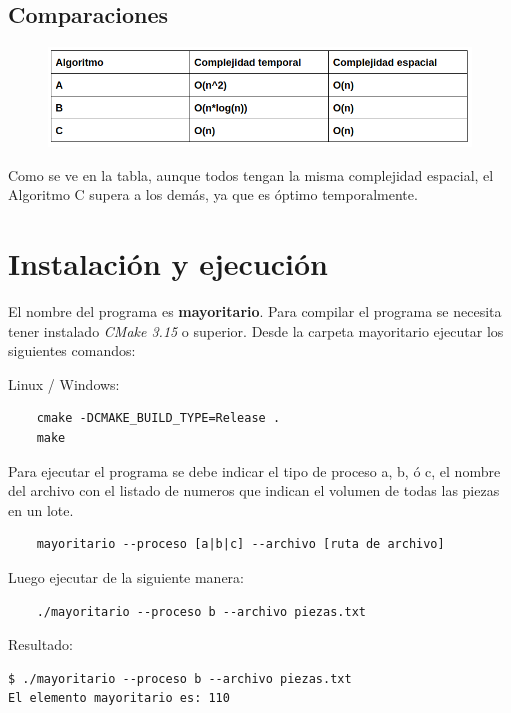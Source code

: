 \documentclass{article}
\begin{document}
\subsection{Comparaciones}

\begin{figure}[h!]
    \includegraphics[width=\linewidth]{comparacion.png}
\end{figure}


Como se ve en la tabla, aunque todos tengan la misma complejidad espacial, el Algoritmo C supera a los demás, ya que es óptimo temporalmente.

\newpage
\section{Instalación y ejecución}

El nombre del programa es \textbf{mayoritario}. Para compilar el programa se necesita tener 
instalado \textit{CMake 3.15} o superior. 
Desde la carpeta mayoritario ejecutar los siguientes comandos:

Linux / Windows:

\begin{lstlisting}
    cmake -DCMAKE_BUILD_TYPE=Release .
    make    
\end{lstlisting}


Para ejecutar el programa se debe indicar el tipo de proceso a, b, ó c, el nombre del archivo con el listado de numeros 
que indican el volumen de todas las piezas en un lote.

\begin{lstlisting}
    mayoritario --proceso [a|b|c] --archivo [ruta de archivo]
\end{lstlisting}

Luego ejecutar de la siguiente manera:

\begin{lstlisting}
    ./mayoritario --proceso b --archivo piezas.txt
\end{lstlisting}

Resultado:
\begin{lstlisting}
$ ./mayoritario --proceso b --archivo piezas.txt
El elemento mayoritario es: 110    
\end{lstlisting}
\end{document}
